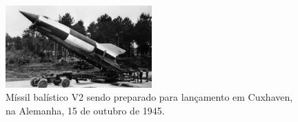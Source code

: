 




\begin{figure}[ht]
    \centering
    \caption{Míssil balístico V2 sendo preparado para lançamento em Cuxhaven, na Alemanha, 15 de  outubro de 1945.}
    \begin{center}
        \includegraphics[width=0.5\textwidth]{img/missil_balistico_V2.jpg}
    \end{center}
    \vspace{-0.5cm}
    \label{fig:foguete-V2}
\end{figure}




